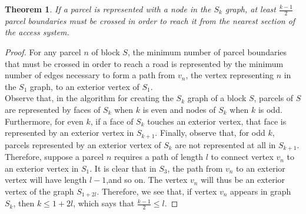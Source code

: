 \documentclass[10pt]{article}
\newtheorem{theorem}{Theorem}
\begin{document}
\begin{theorem}
    If a parcel is represented with a node in the $S_k$ graph, at least $\frac{k-1}{2}$ parcel boundaries must be crossed in order to reach it from the nearest section of the access system.
\end{theorem}
\begin{proof}
For any parcel $n$ of block $S$, the minimum number of parcel boundaries that must be crossed in order to reach a road is represented by the minimum number of edges necessary to form a path from $v_n$, the vertex representing $n$ in the $S_1$ graph, to an exterior vertex of $S_1$.\\

Observe that, in the algorithm for creating the $S_k$ graph of a block $S$, parcels of $S$ are represented by faces of $S_k$ when $k$ is even and nodes of $S_k$ when $k$ is odd. Furthermore, for even $k$, if a face of $S_k$ touches an exterior vertex, that face is represented by an exterior vertex in $S_{k+1}$. Finally, observe that, for odd $k$, parcels represented by an exterior vertex of $S_k$ are not represented at all in $S_{k+1}$.\\

Therefore, suppose a parcel $n$ requires a path of length $l$ to connect vertex $v_n$ to an exterior vertex in $S_1$. It is clear that in $S_3$, the path from $v_n$ to an exterior vertex will have length $l-1$,and so on. The vertex $v_n$ will thus be an exterior vertex of the graph $S_{1+2l}$. Therefore, we see that, if vertex $v_n$ appears in graph $S_k$, then $k\leq 1+2l$, which says that $\frac{k-1}{2}\leq l$.
\end{proof}
\end{document}
